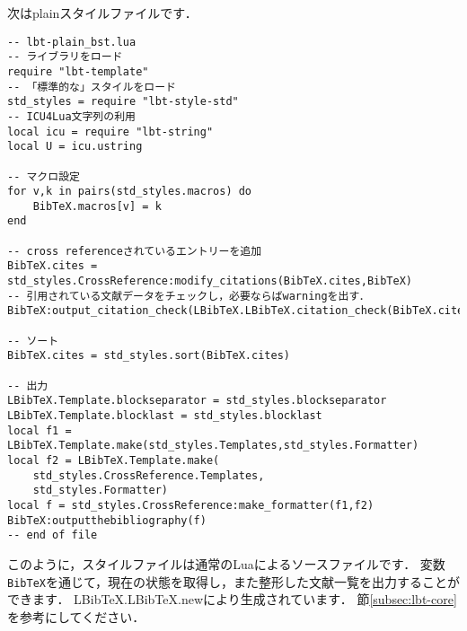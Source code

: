 \documentclass[dvipdfmx,a4paper]{jsarticle}
\begin{document}
次はplainスタイルファイルです．
\begin{lstlisting}
-- lbt-plain_bst.lua
-- ライブラリをロード
require "lbt-template"
-- 「標準的な」スタイルをロード
std_styles = require "lbt-style-std"
-- ICU4Lua文字列の利用
local icu = require "lbt-string"
local U = icu.ustring

-- マクロ設定
for v,k in pairs(std_styles.macros) do
	BibTeX.macros[v] = k
end

-- cross referenceされているエントリーを追加
BibTeX.cites = std_styles.CrossReference:modify_citations(BibTeX.cites,BibTeX)
-- 引用されている文献データをチェックし，必要ならばwarningを出す．
BibTeX:output_citation_check(LBibTeX.LBibTeX.citation_check(BibTeX.cites))

-- ソート
BibTeX.cites = std_styles.sort(BibTeX.cites)

-- 出力
LBibTeX.Template.blockseparator = std_styles.blockseparator
LBibTeX.Template.blocklast = std_styles.blocklast
local f1 = LBibTeX.Template.make(std_styles.Templates,std_styles.Formatter)
local f2 = LBibTeX.Template.make(
	std_styles.CrossReference.Templates,
	std_styles.Formatter)
local f = std_styles.CrossReference:make_formatter(f1,f2)
BibTeX:outputthebibliography(f)
-- end of file
\end{lstlisting}

このように，スタイルファイルは通常のLuaによるソースファイルです．
変数\verb|BibTeX|を通じて，現在の状態を取得し，また整形した文献一覧を出力することができます．
LBibTeX.LBibTeX.newにより生成されています．
節\ref{subsec:lbt-core}を参考にしてください．
\end{document}
